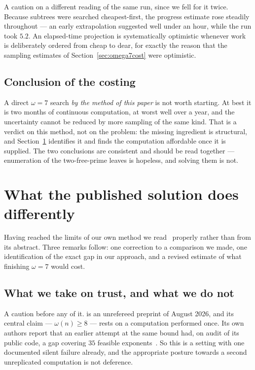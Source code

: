 \documentclass[11pt]{amsart}
\theoremstyle{remark}
\begin{document}
A caution on a different reading of the same run, since we fell for it twice.
Because subtrees were searched cheapest-first, the progress estimate rose
steadily throughout --- an early extrapolation suggested well under an hour,
while the run took $5.2$. An elapsed-time projection is systematically
optimistic whenever work is deliberately ordered from cheap to dear, for exactly
the reason that the sampling estimates of Section~\ref{sec:omega7cost} were
optimistic.

\subsection{Conclusion of the costing}
A direct $\omega = 7$ search \emph{by the method of this paper} is not worth
starting. At best it is two months of continuous computation, at worst well over a
year, and the uncertainty cannot be reduced by more sampling of the same kind.
That is a verdict on this method, not on the problem: the missing ingredient is
structural, and Section~\ref{sec:theirlemmas} identifies it and finds the
computation affordable once it is supplied. The two conclusions are consistent and
should be read together --- enumeration of the two-free-prime leaves is hopeless,
and solving them is not.

\section{What the published solution does differently}\label{sec:theirlemmas}

Having reached the limits of our own method we read~\cite{tty} properly rather
than from its abstract. Three remarks follow: one correction to a comparison we
made, one identification of the exact gap in our approach, and a revised estimate
of what finishing $\omega = 7$ would cost.

\subsection{What we take on trust, and what we do not}\label{sec:trust}
A caution before any of it. \cite{tty} is an unrefereed preprint of August 2026,
and its central claim --- $\omega(n) \ge 8$ --- rests on a computation performed
once. Its own authors report that an earlier attempt at the same bound had, on
audit of its public code, a gap covering $35$ feasible
exponents~\cite{zemann}. So this is a setting with one documented silent failure
already, and the appropriate posture towards a second unreplicated computation is
not deference.
\end{document}
